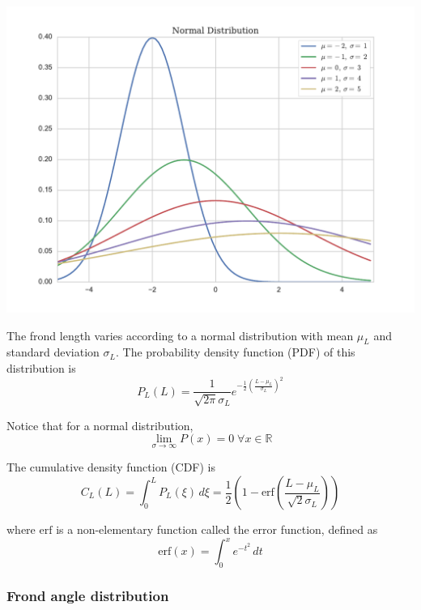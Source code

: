 \documentclass{article}
\newenvironment{mcfig}
	{\par\medskip\noindent\minipage{\linewidth}}
	{\endminipage\par\medskip}
\newcommand{\erf}{\mbox{erf}}
\begin{document}
\begin{multicols}{2}
\begin{mcfig}
	\centering
	\includegraphics[width=\linewidth]{normal}
	\label{fig:normal}
\end{mcfig}

The frond length varies according to a normal distribution with mean $\mu_L$ and standard deviation $\sigma_L$. The probability density function (PDF) of this distribution is
\begin{equation}
	P_L(L) = \frac{1}{\sqrt{2\pi}\sigma_L} e^{-\frac{1}{2}\left(\frac{L-\mu_L}{\sigma_L}\right)^2}
\end{equation}

Notice that for a normal distribution,
\begin{equation}
	\displaystyle \lim_{\sigma \to \infty}P(x) = 0 \;\forall x \in \mathbb{R}
\end{equation}

The cumulative density function (CDF) is
\begin{equation}
	C_L(L) = \int_0^L P_L(\xi)\,d\xi = \frac{1}{2}\left(1-\erf\left(\frac{L-\mu_L}{\sqrt{2}\sigma_L}\right)\right)
\end{equation}

where $\erf$ is a non-elementary function called the error function, defined as
\begin{equation}
	\erf(x) = \int_0^x e^{-t^2}\,dt
\end{equation}

\subsubsection{Frond angle distribution}


\end{multicols}
\end{document}
